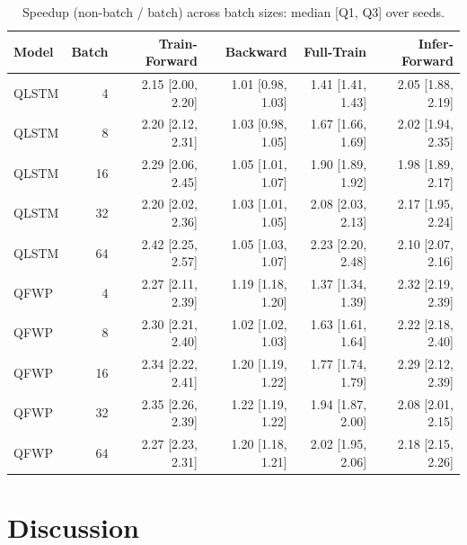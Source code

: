 \documentclass{article}
\begin{document}
\begin{table}[!t]
  \centering
  \small
  \caption{Speedup (non-batch / batch) across batch sizes: median [Q1, Q3] over seeds.}
  \label{tab:speedup_decomp}
  \begin{tabular*}{\textwidth}{@{\extracolsep{\fill}}lrrrrr}
    \toprule
    Model & Batch & Train-Forward & Backward & Full-Train & Infer-Forward \\
    \midrule
    QLSTM & 4 & 2.15 [2.00, 2.20] & 1.01 [0.98, 1.03] & 1.41 [1.41, 1.43] & 2.05 [1.88, 2.19] \\
    QLSTM & 8 & 2.20 [2.12, 2.31] & 1.03 [0.98, 1.05] & 1.67 [1.66, 1.69] & 2.02 [1.94, 2.35] \\
    QLSTM & 16 & 2.29 [2.06, 2.45] & 1.05 [1.01, 1.07] & 1.90 [1.89, 1.92] & 1.98 [1.89, 2.17] \\
    QLSTM & 32 & 2.20 [2.02, 2.36] & 1.03 [1.01, 1.05] & 2.08 [2.03, 2.13] & 2.17 [1.95, 2.24] \\
    QLSTM & 64 & 2.42 [2.25, 2.57] & 1.05 [1.03, 1.07] & 2.23 [2.20, 2.48] & 2.10 [2.07, 2.16] \\
    QFWP & 4 & 2.27 [2.11, 2.39] & 1.19 [1.18, 1.20] & 1.37 [1.34, 1.39] & 2.32 [2.19, 2.39] \\
    QFWP & 8 & 2.30 [2.21, 2.40] & 1.02 [1.02, 1.03] & 1.63 [1.61, 1.64] & 2.22 [2.18, 2.40] \\
    QFWP & 16 & 2.34 [2.22, 2.41] & 1.20 [1.19, 1.22] & 1.77 [1.74, 1.79] & 2.29 [2.12, 2.39] \\
    QFWP & 32 & 2.35 [2.26, 2.39] & 1.22 [1.19, 1.22] & 1.94 [1.87, 2.00] & 2.08 [2.01, 2.15] \\
    QFWP & 64 & 2.27 [2.23, 2.31] & 1.20 [1.18, 1.21] & 2.02 [1.95, 2.06] & 2.18 [2.15, 2.26] \\
    \bottomrule
  \end{tabular*}
\end{table}


\section{Discussion}
\label{sec:discussion}
\end{document}
